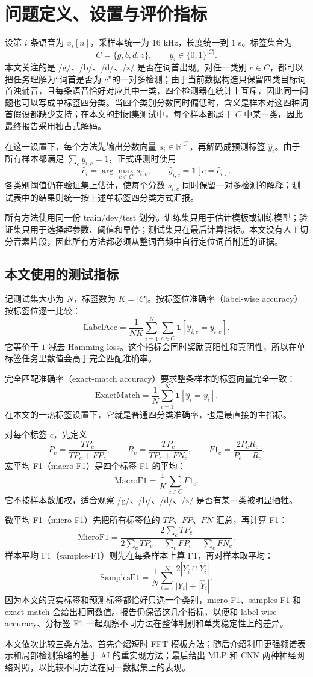 \section{问题定义、设置与评价指标}

设第 $i$ 条语音为 $x_i[n]$，采样率统一为 $16$ kHz，长度统一到 $1$ s。标签集合为
\[
C=\{g,b,d,z\}, \qquad y_i\in\{0,1\}^{|C|}.
\]
本文关注的是 /g/、/b/、/d/、/z/ 是否在词首出现。对任一类别 $c\in C$，都可以把任务理解为“词首是否为 $c$”的一对多检测；由于当前数据构造只保留四类目标词首浊辅音，且每条语音恰好对应其中一类，四个检测器在统计上互斥，因此同一问题也可以写成单标签四分类。当四个类别分数同时偏低时，含义是样本对这四种词首假设都缺少支持；在本文的封闭集测试中，每个样本都属于 $C$ 中某一类，因此最终报告采用独占式解码。

在这一设置下，每个方法先输出分数向量 $s_i\in\mathbb{R}^{|C|}$，再解码成预测标签 $\hat y_i$。由于所有样本都满足 $\sum_c y_{i,c}=1$，正式评测时使用
\[
\hat c_i=\arg\max_{c\in C}s_{i,c},\qquad
\hat y_{i,c}=\mathbf{1}[c=\hat c_i].
\]
各类别阈值仍在验证集上估计，使每个分数 $s_{i,c}$ 同时保留一对多检测的解释；测试表中的结果则统一按上述单标签四分类方式汇报。

所有方法使用同一份 train/dev/test 划分。训练集只用于估计模板或训练模型；验证集只用于选择超参数、阈值和早停；测试集只在最后计算指标。本文没有人工切分音素片段，因此所有方法都必须从整词音频中自行定位词首附近的证据。

\subsection{本文使用的测试指标}

记测试集大小为 $N$，标签数为 $K=|C|$。按标签位准确率（label-wise accuracy）按标签位逐一比较：
\[
\mathrm{LabelAcc}
=\frac{1}{NK}\sum_{i=1}^{N}\sum_{c\in C}\mathbf{1}[\hat y_{i,c}=y_{i,c}].
\]
它等价于 $1$ 减去 Hamming loss。这个指标会同时奖励真阳性和真阴性，所以在单标签任务里数值会高于完全匹配准确率。

完全匹配准确率（exact-match accuracy）要求整条样本的标签向量完全一致：
\[
\mathrm{ExactMatch}
=\frac{1}{N}\sum_{i=1}^{N}\mathbf{1}[\hat y_i=y_i].
\]
在本文的一热标签设置下，它就是普通四分类准确率，也是最直接的主指标。

对每个标签 $c$，先定义
\[
P_c=\frac{TP_c}{TP_c+FP_c},\qquad
R_c=\frac{TP_c}{TP_c+FN_c},\qquad
F1_c=\frac{2P_cR_c}{P_c+R_c}.
\]
宏平均 F1（macro-F1）是四个标签 F1 的平均：
\[
\mathrm{MacroF1}=\frac{1}{K}\sum_{c\in C}F1_c.
\]
它不按样本数加权，适合观察 /g/、/b/、/d/、/z/ 是否有某一类被明显牺牲。

微平均 F1（micro-F1）先把所有标签位的 $TP$、$FP$、$FN$ 汇总，再计算 F1：
\[
\mathrm{MicroF1}
=\frac{2\sum_c TP_c}{2\sum_c TP_c+\sum_c FP_c+\sum_c FN_c}.
\]
样本平均 F1（samples-F1）则先在每条样本上算 F1，再对样本取平均：
\[
\mathrm{SamplesF1}
=\frac{1}{N}\sum_{i=1}^{N}
\frac{2|Y_i\cap \hat Y_i|}{|Y_i|+|\hat Y_i|}.
\]
因为本文的真实标签和预测标签都恰好只选一个类别，micro-F1、samples-F1 和 exact-match 会给出相同数值。报告仍保留这几个指标，以便和 label-wise accuracy、分标签 F1 一起观察不同方法在整体判别和单类稳定性上的差异。

本文依次比较三类方法。首先介绍短时 FFT 模板方法；随后介绍利用更强频谱表示和局部检测策略的基于 AI 的重实现方法；最后给出 MLP 和 CNN 两种神经网络对照，以比较不同方法在同一数据集上的表现。
